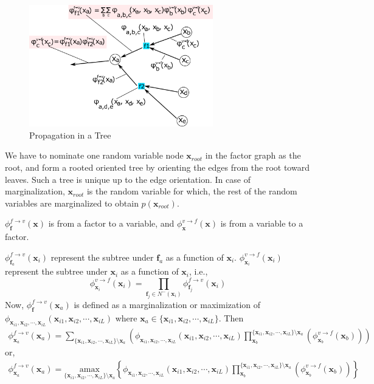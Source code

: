 \documentclass[a4]{article}
\begin{document}
\begin{figure}[!htb]
\centering
\includegraphics[width=8cm]{tree.png}
\caption{Propagation in a Tree}
\label{fig:tree}
\end{figure}

We have to nominate one random variable node $\bm{x}_{root}$ in the factor graph as the root, and
form a rooted oriented tree by orienting the edges from the root toward leaves. Such a tree is unique up to the edge
orientation. In case of marginalization, $\bm{x}_{root}$ is the random variable for which, the rest of the random variables
are marginalized to obtain $p(\bm{x}_{root})$.

$\phi^{f\rightarrow v}_{\bm{f}}(\bm{x})$ is from a factor to a variable, and
$\phi^{v\rightarrow f}_{\bm{x}}(\bm{x})$ is from a variable to a factor.

$\phi^{f\rightarrow v}_{\bm{f}_a}(\bm{x}_i)$ represent the subtree under $\bm{f}_a$ as a function of $\bm{x}_i$.
$\phi^{v\rightarrow f}_{\bm{x}_i}(\bm{x}_i)$ represent the subtree under $\bm{x}_i$ as a function of $\bm{x}_i$, i.e., 
$$\phi^{v\rightarrow f}_{\bm{x}_i}(\bm{x}_i) = \prod_{\bm{f}_j \in N^-(\bm{x}_i)}\phi^{f\rightarrow v}_{\bm{f}_j}(\bm{x}_i)$$
Now, $\phi^{f\rightarrow v}_{\bm{f}}(\bm{x}_a)$ is defined as a marginalization or maximization of 
$\phi_{\bm{x}_{i1},\bm{x}_{i2},\cdots, \bm{x}_{iL}}(\bm{x}_{i1},\bm{x}_{i2},\cdots, \bm{x}_{iL})$
where $\bm{x}_a \in \{\bm{x}_{i1},\bm{x}_{i2},\cdots, \bm{x}_{iL}\}$.
Then 
\begin{equation}
\begin{aligned}
\phi^{f\rightarrow v}_{\bm{x}_a}(\bm{x}_a)
=
\sum_{\{\bm{x}_{i1},\bm{x}_{i2},\cdots, \bm{x}_{iL}\}\setminus\bm{x}_a}\left(
    \phi_{\bm{x}_{i1},\bm{x}_{i2},\cdots, \bm{x}_{iL}}(\bm{x}_{i1},\bm{x}_{i2},\cdots, \bm{x}_{iL})
    \prod_{\bm{x}_b}^{\{\bm{x}_{i1},\bm{x}_{i2},\cdots, \bm{x}_{iL}\}\setminus\bm{x}_a}\left(
        \phi^{v\rightarrow f}_{\bm{x}_b}(\bm{x}_b)
    \right)
\right)
\end{aligned}
\end{equation}
or, 
\begin{equation}
\begin{aligned}
\phi^{f\rightarrow v}_{\bm{x}_a}(\bm{x}_a)
=
\underset{\{\bm{x}_{i1},\bm{x}_{i2},\cdots, \bm{x}_{iL}\}\setminus\bm{x}_a}{\mathrm{amax}}
\left\{
    \phi_{\bm{x}_{i1},\bm{x}_{i2},\cdots, \bm{x}_{iL}}(\bm{x}_{i1},\bm{x}_{i2},\cdots, \bm{x}_{iL})
    \prod_{\bm{x}_b}^{\{\bm{x}_{i1},\bm{x}_{i2},\cdots, \bm{x}_{iL}\}\setminus\bm{x}_a}\left(
        \phi^{v\rightarrow f}_{\bm{x}_b}(\bm{x}_b)
    \right)
\right\}
\end{aligned}
\end{equation}
\end{document}
